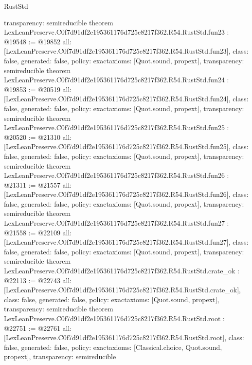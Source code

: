 \begin{lexlean}{RustStd}
\begin{coremodule}
{  transparency: semireducible
}
theorem LexLeanPreserve.C0f7d91df2e195361176d725c8217f362.R54.RustStd.fun23 : @19548 := @19852 {
  all: [LexLeanPreserve.C0f7d91df2e195361176d725c8217f362.R54.RustStd.fun23],
  class: false,
  generated: false,
  policy: exact{axioms: [Quot.sound, propext]},
  transparency: semireducible
}
theorem LexLeanPreserve.C0f7d91df2e195361176d725c8217f362.R54.RustStd.fun24 : @19853 := @20519 {
  all: [LexLeanPreserve.C0f7d91df2e195361176d725c8217f362.R54.RustStd.fun24],
  class: false,
  generated: false,
  policy: exact{axioms: [Quot.sound, propext]},
  transparency: semireducible
}
theorem LexLeanPreserve.C0f7d91df2e195361176d725c8217f362.R54.RustStd.fun25 : @20520 := @21310 {
  all: [LexLeanPreserve.C0f7d91df2e195361176d725c8217f362.R54.RustStd.fun25],
  class: false,
  generated: false,
  policy: exact{axioms: [Quot.sound, propext]},
  transparency: semireducible
}
theorem LexLeanPreserve.C0f7d91df2e195361176d725c8217f362.R54.RustStd.fun26 : @21311 := @21557 {
  all: [LexLeanPreserve.C0f7d91df2e195361176d725c8217f362.R54.RustStd.fun26],
  class: false,
  generated: false,
  policy: exact{axioms: [Quot.sound, propext]},
  transparency: semireducible
}
theorem LexLeanPreserve.C0f7d91df2e195361176d725c8217f362.R54.RustStd.fun27 : @21558 := @22109 {
  all: [LexLeanPreserve.C0f7d91df2e195361176d725c8217f362.R54.RustStd.fun27],
  class: false,
  generated: false,
  policy: exact{axioms: [Quot.sound, propext]},
  transparency: semireducible
}
theorem LexLeanPreserve.C0f7d91df2e195361176d725c8217f362.R54.RustStd.crate_ok : @22113 := @22743 {
  all: [LexLeanPreserve.C0f7d91df2e195361176d725c8217f362.R54.RustStd.crate_ok],
  class: false,
  generated: false,
  policy: exact{axioms: [Quot.sound, propext]},
  transparency: semireducible
}
theorem LexLeanPreserve.C0f7d91df2e195361176d725c8217f362.R54.RustStd.root : @22751 := @22761 {
  all: [LexLeanPreserve.C0f7d91df2e195361176d725c8217f362.R54.RustStd.root],
  class: false,
  generated: false,
  policy: exact{axioms: [Classical.choice, Quot.sound, propext]},
  transparency: semireducible
}


\end{coremodule}
\end{lexlean}

